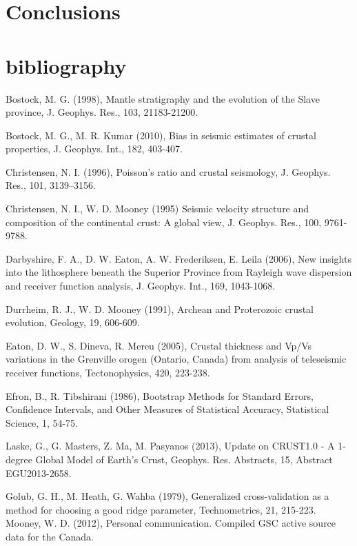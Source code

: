 \documentclass[draft, 12pt]{article}
\begin{document}
\section{Conclusions}



\section{bibliography}

Bostock, M. G. (1998), Mantle stratigraphy and the evolution of the Slave province, J. Geophys. Res., 103, 21183-21200.

Bostock, M. G., M. R. Kumar (2010), Bias in seismic estimates of crustal properties, J. Geophys. Int., 182, 403-407.

Christensen, N. I. (1996), Poisson's ratio and crustal seismology, J. Geophys. Res., 101, 3139–3156.

Christensen, N. I., W. D. Mooney (1995) Seismic velocity structure and composition of the continental crust: A global view, J. Geophys. Res., 100, 9761-9788.

Darbyshire, F. A., D. W. Eaton, A. W. Frederiksen, E. Leila (2006), New insights into the lithosphere beneath the Superior Province from Rayleigh wave dispersion and receiver function analysis, J. Geophys. Int., 169, 1043-1068.

Durrheim, R. J., W. D. Mooney (1991), Archean and Proterozoic crustal evolution, Geology, 19, 606-609.

Eaton, D. W., S. Dineva, R. Mereu (2005), Crustal thickness and Vp/Vs variations in the Grenville orogen (Ontario, Canada) from analysis of teleseismic receiver functions, Tectonophysics, 420, 223-238.

Efron, B., R. Tibshirani (1986), Bootstrap Methods for Standard Errors, Confidence Intervals, and Other Measures of Statistical Accuracy, Statistical Science, 1, 54-75.

Laske, G., G. Masters, Z. Ma, M. Pasyanos (2013), Update on CRUST1.0 - A 1-degree Global Model of Earth's Crust, Geophys. Res. Abstracts, 15, Abstract EGU2013-2658.

Golub, G. H., M. Heath, G. Wahba (1979), Generalized cross-validation as a method for choosing a good ridge parameter, Technometrics, 21, 215-223.
Mooney, W. D. (2012), Personal communication. Compiled GSC active source data for the Canada.
\end{document}
